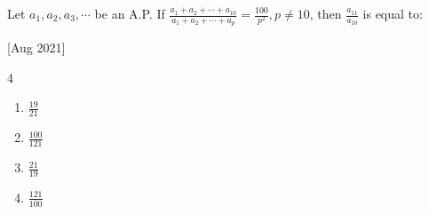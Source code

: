     \item Let $a_1,a_2,a_3,\cdots$ be an A.P. If $\frac{a_1+a_2+\cdots+a_{10}}{a_1+a_2+\cdots+a_p}=\frac{100}{p^2},p\neq10$, then $\frac{a_{11}}{a_{10}}$ is equal to:
    
    \hfill{[Aug 2021]}
    
        \begin{multicols}{4}
            \begin{enumerate}
                \item $\frac{19}{21}$
                \item $\frac{100}{121}$
                \item $\frac{21}{19}$
                \item $\frac{121}{100}$
            \end{enumerate}
        \end{multicols}

